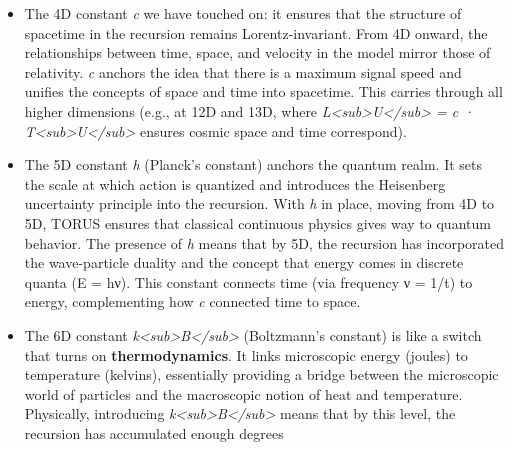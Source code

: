 \documentclass[]{article}
\begin{document}
{{\begin{itemize}
  is as strong as its quantum effects -- an anchor point where our usual
  separation of ``quantum vs gravity'' breaks down. TORUS takes the
  observed gravitational constant and shows it indeed yields a Planck
<<<<<<< HEAD
  mass of \textasciitilde2×10\^{}-8 kg, which matches this required
=======
  mass of \textasciitilde{}2×10\^{}-8 kg, which matches this required
>>>>>>> 5d40795 (Fix: robust Unicode/maths in LaTeX and explicit push to main in workflow)
  balance. The fact that nature's actual \emph{G} produces the expected
  m\textless{}sub\textgreater{}P\textless{}/sub\textgreater{} is a
  strong consistency check for TORUS​ -- it means the ``anchor'' was
  placed correctly.
\item
  The 4D constant \emph{c} we have touched on: it ensures that the
  structure of spacetime in the recursion remains Lorentz-invariant.
  From 4D onward, the relationships between time, space, and velocity in
  the model mirror those of relativity. \emph{c} anchors the idea that
  there is a maximum signal speed and unifies the concepts of space and
  time into spacetime. This carries through all higher dimensions (e.g.,
  at 12D and 13D, where
  \emph{L\textless{}sub\textgreater{}U\textless{}/sub\textgreater{} = c
  · T\textless{}sub\textgreater{}U\textless{}/sub\textgreater{}} ensures
  cosmic space and time correspond​).
\item
  The 5D constant \emph{h} (Planck's constant) anchors the quantum
  realm. It sets the scale at which action is quantized and introduces
  the Heisenberg uncertainty principle into the recursion. With \emph{h}
  in place, moving from 4D to 5D, TORUS ensures that classical
  continuous physics gives way to quantum behavior. The presence of
  \emph{h} means that by 5D, the recursion has incorporated the
  wave-particle duality and the concept that energy comes in discrete
  quanta (E = hν). This constant connects time (via frequency ν = 1/t)
  to energy, complementing how \emph{c} connected time to space.
\item
  The 6D constant
  \emph{k\textless{}sub\textgreater{}B\textless{}/sub\textgreater{}}
  (Boltzmann's constant) is like a switch that turns on
  \textbf{thermodynamics}. It links microscopic energy (joules) to
  temperature (kelvins), essentially providing a bridge between the
  microscopic world of particles and the macroscopic notion of heat and
  temperature. Physically, introducing
  \emph{k\textless{}sub\textgreater{}B\textless{}/sub\textgreater{}}
  means that by this level, the recursion has accumulated enough degrees

\end{itemize}}}
\end{document}
